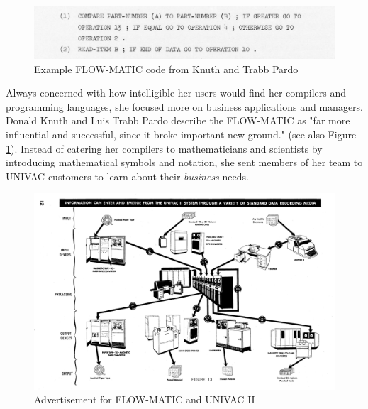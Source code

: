 \begin{figure}[h]
    \centering
    \includegraphics[width=.7\textwidth]{resource/flow-matic-example-knuth-pardo.png}
    \caption{Example FLOW-MATIC code from Knuth and Trabb Pardo\cite{Knuth_TrabbPardo_1976_Early_Development}}
    \label{fig:knuth-pardo-flow-matic-example}
\end{figure}

Always concerned with how intelligible her users would find her compilers
and programming languages, she focused more on business applications and managers.
Donald Knuth and Luis Trabb Pardo describe the FLOW-MATIC as
"far more influential and successful, since it broke important new ground."
\cite{Knuth_TrabbPardo_1976_Early_Development}
(see also Figure \ref{fig:knuth-pardo-flow-matic-example}).
Instead of catering her compilers to mathematicians and scientists
by introducing mathematical symbols and notation, she sent members of
her team to UNIVAC customers to learn about their \textit{business} needs.

\begin{figure}
    \centering
    \includegraphics[width=.7\textwidth]{resource/flow-matic-ad-1959.png}
    \caption{Advertisement for FLOW-MATIC and UNIVAC II}
    \label{fig:flow-matic-ad-1959}
\end{figure}

